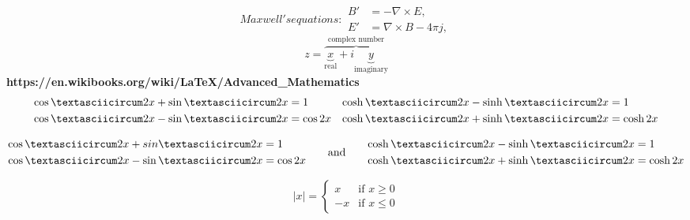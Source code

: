 \documentclass{article}
\theoremstyle{definition}
\theoremstyle{remark}
\theoremstyle{plain}
\numberwithin{equation}{subsection}
\begin{document}
{\begin{equation}
\end{equation}
\begin{subequations}
	Maxwell's equations:
	\begin{align}
	B'&=-\nabla \times E,\\
	E'&=\nabla \times B - 4\pi j,
	\end{align}
\end{subequations}
\[
z = \overbrace{
	\underbrace{x}_\text{real} + i
	\underbrace{y}_\text{imaginary}
}^\text{complex number}
\]
\textbf{https://en.wikibooks.org/wiki/LaTeX/Advanced\_Mathematics}
\begin{align*}
\cosˆ2x+\sinˆ2x & = 1 & \coshˆ2x-\sinhˆ2x & = 1\\
\cosˆ2x-\sinˆ2x & = \cos 2x & \coshˆ2x+\sinhˆ2x & = \cosh 2x
\end{align*}

\begin{equation}
\begin{aligned}
\cosˆ2x+sinˆ2x & = 1\\
\cosˆ2x-\sinˆ2x & = \cos 2x
\end{aligned}
\qquad\text{and}\qquad
\begin{aligned}
\coshˆ2x-\sinhˆ2x & = 1\\
\coshˆ2x+\sinhˆ2x & = \cosh 2x
\end{aligned}
\end{equation}

\begin{equation}
|x| =
\begin{cases}
x & \text{if $x\ge 0$}\\
-x & \text{if $x\le 0$}
\end{cases}
\end{equation}\\
}
\end{document}
